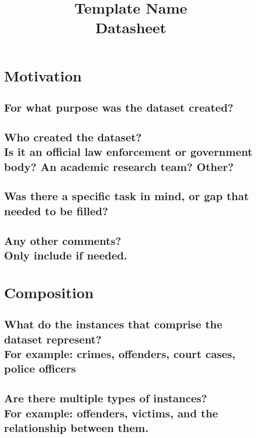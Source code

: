 \documentclass[letterpaper, 10 pt, conference]{ieeeconf}  %
\title{\LARGE \bf
Template Name \\{\color{blue}Datasheet}
}
\newcommand{\subtitle}[1]{{\\ \small \normalfont \color{purple} #1}}
\begin{document}
\maketitle
\thispagestyle{empty}
\pagestyle{empty}

\section{Motivation}

\subsection{For what purpose was the dataset created?}

\subsection{Who created the dataset? \subtitle{Is it an official law enforcement or government body? An academic research team? Other?}}

\subsection{Was there a specific task in mind, or gap that needed to be filled?}

\subsection{Any other comments?
\subtitle{Only include if needed.}}

\section{Composition}

\subsection{What do the instances that comprise the dataset represent? \subtitle{For example: crimes, offenders, court cases, police officers}}

\subsection{Are there multiple types of instances? \subtitle{For example: offenders, victims, and the relationship between them.}}
\end{document}
